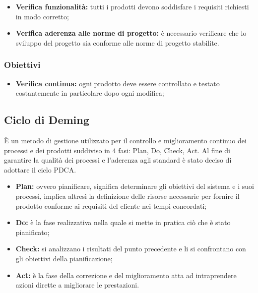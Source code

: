 \begin{itemize}
    \item  \textbf{Verifica funzionalità:} tutti i prodotti devono soddisfare i requisiti richiesti in modo corretto;
    \item \textbf{Verifica aderenza alle norme di progetto:} è necessario verificare che lo sviluppo del progetto sia conforme alle norme di progetto stabilite.
    
\end{itemize}


\subsubsection{Obiettivi}
\begin{itemize}
    \item \textbf{Verifica continua:} ogni prodotto deve essere controllato e testato costantemente in particolare dopo ogni modifica;

\end{itemize}

\subsection{Ciclo di Deming}
È un metodo di gestione utilizzato per il controllo e miglioramento continuo dei processi e dei prodotti suddiviso in 4 fasi: Plan, Do, Check, Act.
Al fine di garantire la qualità dei processi e l'aderenza agli standard è stato deciso di adottare il ciclo PDCA.
\begin{itemize}
    \item \textbf{Plan:} ovvero pianificare, significa determinare gli obiettivi del sistema e i suoi processi, implica altresì la definizione delle risorse necessarie per fornire il prodotto conforme ai requisiti del cliente nei tempi concordati;
    \item \textbf{Do:} è la fase realizzativa nella quale si mette in pratica ciò che è stato pianificato;
    \item \textbf{Check:} si analizzano i risultati del punto precedente e li si confrontano con gli obiettivi della pianificazione;
    \item \textbf{Act:} è la fase della correzione e del miglioramento atta ad intraprendere azioni dirette a migliorare le prestazioni.
\end{itemize}














